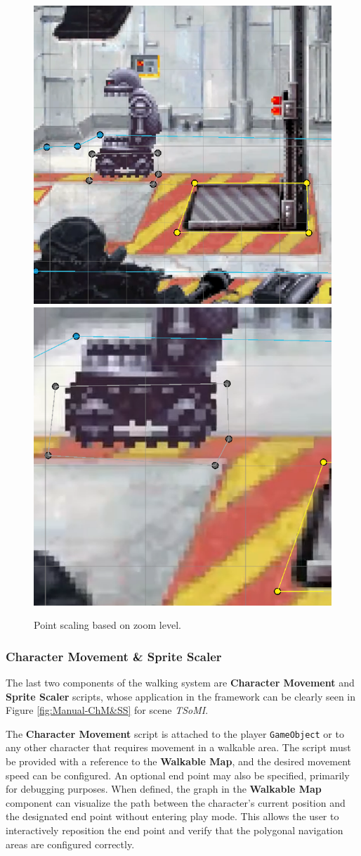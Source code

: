 \begin{figure}[H]
\centering
\includegraphics[width=.48\linewidth]{img/User doc/point_scaling.png}
\includegraphics[width=.48\linewidth]{img/User doc/point_scaling2.png}
\caption{Point scaling based on zoom level.}
\label{fig:Manual-Zoom}
\end{figure}

\subsubsection{Character Movement \& Sprite Scaler}
The last two components of the walking system are \textbf{Character Movement} and \textbf{Sprite Scaler} scripts, whose application in the framework can be clearly seen in Figure \ref{fig:Manual-ChM&SS} for scene \textit{TSoMI}. 

The \textbf{Character Movement} script is attached to the player \verb|GameObject| or to any other character that requires movement in a walkable area. The script must be provided with a reference to the \textbf{Walkable Map}, and the desired movement speed can be configured. An optional end point may also be specified, primarily for debugging purposes. When defined, the graph in the \textbf{Walkable Map} component can visualize the path between the character's current position and the designated end point without entering play mode. This allows the user to interactively reposition the end point and verify that the polygonal navigation areas are configured correctly.

